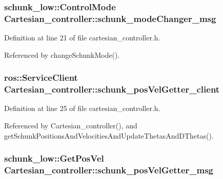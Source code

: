 \hypertarget{classCartesian__controller_a960d66580ba058d3337c89bdf8099948}{
\subsubsection[{schunk\-\_\-mode\-Changer\-\_\-msg}]{\setlength{\rightskip}{0pt plus 5cm}schunk\-\_\-low\-::\-Control\-Mode Cartesian\-\_\-controller\-::schunk\-\_\-mode\-Changer\-\_\-msg\hspace{0.3cm}{\ttfamily [protected]}}}\label{classCartesian__controller_a960d66580ba058d3337c89bdf8099948}


Definition at line 21 of file cartesian\-\_\-controller.\-h.



Referenced by change\-Schunk\-Mode().

\hypertarget{classCartesian__controller_a5c1d9386bc5f219f2edc0d5d1b21f0da}{
\subsubsection[{schunk\-\_\-pos\-Vel\-Getter\-\_\-client}]{\setlength{\rightskip}{0pt plus 5cm}ros\-::\-Service\-Client Cartesian\-\_\-controller\-::schunk\-\_\-pos\-Vel\-Getter\-\_\-client\hspace{0.3cm}{\ttfamily [protected]}}}\label{classCartesian__controller_a5c1d9386bc5f219f2edc0d5d1b21f0da}


Definition at line 25 of file cartesian\-\_\-controller.\-h.



Referenced by Cartesian\-\_\-controller(), and get\-Schunk\-Positions\-And\-Velocities\-And\-Update\-Thetas\-And\-D\-Thetas().

\hypertarget{classCartesian__controller_ae368dcf84dae528612c617cc92fbb69f}{
\subsubsection[{schunk\-\_\-pos\-Vel\-Getter\-\_\-msg}]{\setlength{\rightskip}{0pt plus 5cm}schunk\-\_\-low\-::\-Get\-Pos\-Vel Cartesian\-\_\-controller\-::schunk\-\_\-pos\-Vel\-Getter\-\_\-msg\hspace{0.3cm}{\ttfamily [protected]}}}\label{classCartesian__controller_ae368dcf84dae528612c617cc92fbb69f}


